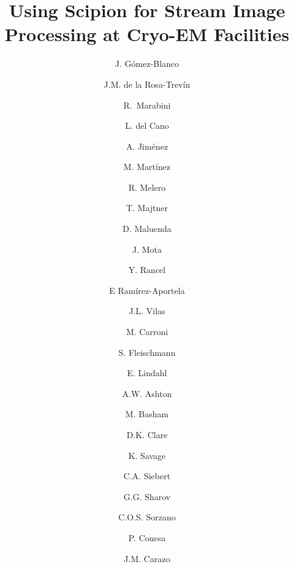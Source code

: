 \documentclass[12, authoryear, preprint]{elsarticle}
\begin{document}
\title{Using Scipion for Stream Image Processing at Cryo-EM Facilities}
\begin{frontmatter}

\author[cnb]{J. G\'{o}mez-Blanco}
\author[su1]{J.M. de la Rosa-Trev\'{i}n}
\author[uam]{R.~Marabini}
\author[cnb]{L. del Cano}
\author[cnb]{A. Jim\'{e}nez}
\author[cnb]{M. Mart\'{i}nez}
\author[cnb]{R. Melero}
\author[cnb]{T. Majtner}
\author[cnb]{D. Maluenda}
\author[cnb]{J. Mota}
\author[cnb]{Y. Rancel}
\author[cnb]{E Ram\'{i}rez-Aportela}
\author[cnb]{J.L. Vilas}
\author[su1]{M. Carroni}
\author[su1]{S. Fleischmann}
\author[su1, su2]{E. Lindahl}
\author[ebic]{A.W. Ashton}
\author[ebic]{M. Basham}
\author[ebic]{D.K. Clare}
\author[ebic]{K. Savage}
\author[ebic]{C.A. Siebert}
\author[mrc]{G.G. Sharov}
\author[cnb]{C.O.S. Sorzano}
\author[cnb]{P. Conesa}
\author[cnb]{J.M. Carazo}


\maketitle
\address[cnb]{Biocomputing Unit, National Center for Biotechnology (CSIC), C/ Darwin, 3, Campus Universidad Aut\'{o}noma, 28049 Cantoblanco, Madrid, Spain.}
\address[su1]{Department of Biochemistry and Biophysics, Science for Life Laboratory, Stockholm University, Stockholm, Sweden} 
\address[uam]{Escuela Polit\'{e}cnica Superior, Universidad Aut\'{o}noma de Madrid, 28049 Cantoblanco, Madrid, Spain.}
\address[su2]{Swedish e-Science Research Center, KTH Royal Institute of Technology, Stockholm, Sweden}
\address[ebic]{Diamond Light Source, Harwell Science and Innovation Campus, Didcot OX11 0DE, United Kingdom}
\address[mrc]{Medical Research Council Laboratory of Molecular Biology, Francis Crick Avenue, Cambridge CB2 OQH, UK}


\setcounter{figure}{2}%


\end{frontmatter}






\appendix




\clearpage
%

\newpage
%
%
\end{document}
